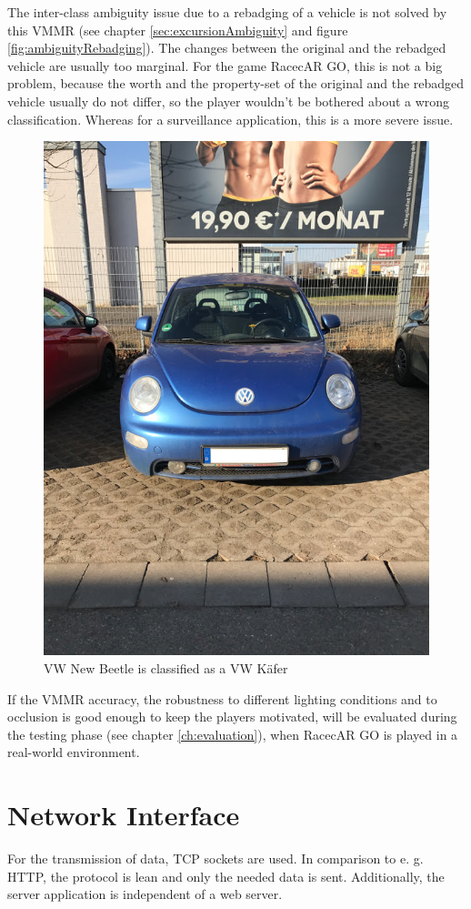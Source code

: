 The inter-class ambiguity issue due to a rebadging of a vehicle is not solved by this VMMR (see chapter \ref{sec:excursionAmbiguity} and figure \ref{fig:ambiguityRebadging}). The changes between the original and the rebadged vehicle are usually too marginal. For the game RacecAR GO, this is not a big problem, because the worth and the property-set of the original and the rebadged vehicle usually do not differ, so the player wouldn't be bothered about a wrong classification. Whereas for a surveillance application, this is a more severe issue.
\begin{figure}[btph]
  \centering
        \includegraphics[width=.2\linewidth]{gfx/test_ambiguity}
        \caption{VW New Beetle is classified as a VW K\"afer}
        \label{fig:testAmbiguity}
\end{figure}

If the VMMR accuracy, the robustness to different lighting conditions and to occlusion is good enough to keep the players motivated, will be evaluated during the testing phase (see chapter \ref{ch:evaluation}), when RacecAR GO is played in a real-world environment.


\section{Network Interface}\label{sec:network}
For the transmission of data, TCP sockets are used. In comparison to e. g. HTTP, the protocol is lean and only the needed data is sent. Additionally, the server application is independent of a web server.

